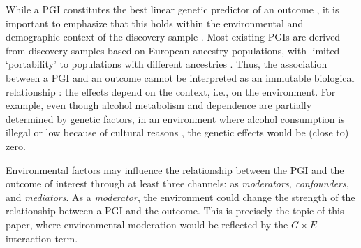 \documentclass[12pt,a4paper]{article}
\begin{document}
\begin{bibunit}
While a PGI constitutes the best linear genetic predictor of an outcome \citep{Mills2020book,Becker2021}, it is important to emphasize that this holds within the environmental and demographic context of the discovery sample \citep{Mills2020book, domingue2020interactions}. Most existing PGIs are derived from discovery samples based on European-ancestry populations, with limited `portability' to populations with different ancestries \citep{benjamin2024social}. Thus, the association between a PGI and an outcome cannot be interpreted as an immutable biological relationship \citep[e.g.,][]{mostafavi2020variable,kweon2020genetic}: the effects depend on the context, i.e., on the environment. For example, even though alcohol metabolism and dependence are partially determined by genetic factors, in an environment where alcohol consumption is illegal or low because of cultural reasons  \citep{cho2015alcohol}, the genetic effects would be (close to) zero.

Environmental factors may influence the relationship between the PGI and the outcome of interest through at least three channels: as \textit{moderators, confounders}, and \textit{mediators}. As a \textit{moderator}, the environment could change the strength of the relationship between a PGI and the outcome. This is precisely the topic of this paper, where environmental moderation would be reflected by the $G \times E$ interaction term.


\end{bibunit}
\end{document}
